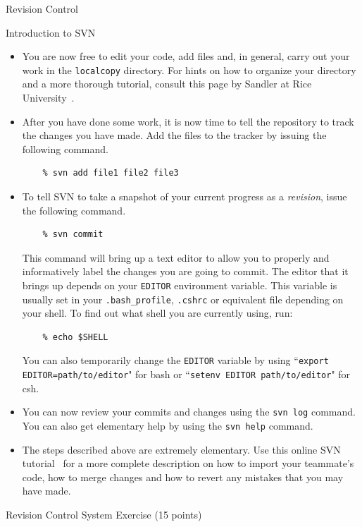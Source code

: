 \documentclass{article}
\begin{document}
\begin{section}{Revision Control}
\begin{subsection}{Introduction to SVN}
\begin{itemize}
	\item You are now free to edit your code, add files and, in
	general, carry out your work in the \texttt{localcopy}
	directory.  For hints on how to organize your directory and a
	more thorough tutorial, consult this page by Sandler at Rice
	University~\cite{Sandler:SVNTutorial}.

	\item After you have done some work, it is now time to tell
	the repository to track the changes you have made.  Add the
	files to the tracker by issuing the following command.
	\begin{verbatim} 
	% svn add file1 file2 file3 
	\end{verbatim}

	\item To tell SVN to take a snapshot of your current progress
	as a \emph{revision}, issue the following command.
	\begin{verbatim} 
	% svn commit 
	\end{verbatim} 
	This command will bring up a text editor to allow you to properly and
	informatively label the changes you are going to commit.  The
	editor that it brings up depends on your \texttt{EDITOR}
	environment variable.  This variable is usually set in your
	\texttt{.bash\_profile}, \texttt{.cshrc} or equivalent file
	depending on your shell.  To find out what shell you are
	currently using, run: 
	\begin{verbatim} 
	% echo $SHELL
	\end{verbatim} 
	You can also temporarily change the
	\texttt{EDITOR} variable by using ``\texttt{export
	EDITOR=path/to/editor}" for bash or ``\texttt{setenv EDITOR
	path/to/editor}" for csh.

	\item You can now review your commits and changes using the
	\texttt{svn log} command.  You can also get elementary help by
	using the \texttt{svn help} command.

	\item The steps described above are extremely elementary.  Use
	this online SVN tutorial~\cite{RedBean:SVN} for a more
	complete description on how to import your teammate's code,
	how to merge changes and how to revert any mistakes that you
	may have made.  \end{itemize} \end{subsection}

	\begin{subsection}{Revision Control System Exercise (15 points)}\label{revision_task}
	

\end{subsection}
\end{section}
\end{document}

